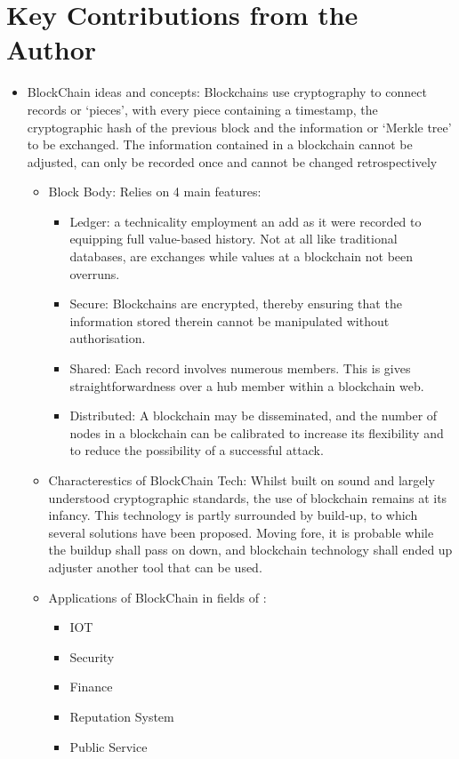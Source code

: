\documentclass{article}
\begin{document}
\section*{Key Contributions from the Author}
\begin{itemize}
    \item BlockChain ideas and concepts: Blockchains use cryptography to connect records or ‘pieces’, with every piece containing a timestamp, the cryptographic hash of the previous block and the information or ‘Merkle tree’ to be exchanged. The information contained in a blockchain cannot be adjusted, can only be recorded once and cannot be changed retrospectively
        \begin{itemize}
        \item Block Body: Relies on 4 main features: 
        \begin{itemize}
            \item Ledger: a technicality employment an add as it were recorded to equipping full value-based history. Not at all like traditional databases, are exchanges while values at a blockchain not been overruns.
            \item Secure: Blockchains are encrypted, thereby ensuring that the information stored therein cannot be manipulated without authorisation.
            \item Shared: Each record involves numerous members. This is gives straightforwardness over a hub member within a blockchain web.
            \item Distributed: A blockchain may be disseminated, and the number of nodes in a blockchain can be calibrated to increase its flexibility and to reduce the possibility of a successful attack.  
        \end{itemize}
    
        \item Characterestics of BlockChain Tech: Whilst built on sound and largely         understood cryptographic standards, the use of blockchain remains at its infancy. This technology is partly surrounded by build-up, to which several solutions have been proposed. Moving fore, it is probable while the buildup shall pass on down, and blockchain technology shall ended up adjuster another tool that can be used.
    
        \item Applications of BlockChain in fields of :
            \begin{itemize}
                \item IOT
                \item Security
                \item Finance
                \item Reputation System
                \item Public Service
            \end{itemize}
    

\end{itemize}
\end{itemize}
\end{document}
